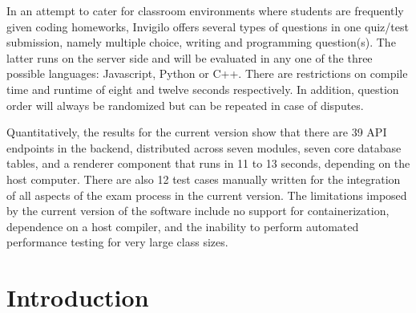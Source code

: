 \documentclass[12pt, a4paper]{report}
\begin{document}
\begin{justify}
{    In an attempt to cater for classroom environments where students are frequently given coding homeworks, Invigilo offers several types of questions in one quiz/test submission, namely multiple choice, writing and programming question(s). The latter runs on the server side and will be evaluated in any one of the three possible languages: Javascript, Python or C++. There are restrictions on compile time and runtime of eight and twelve seconds respectively. In addition, question order will always be randomized but can be repeated in case of disputes.

    Quantitatively, the results for the current version show that there are 39 API endpoints in the backend, distributed across seven modules, seven core database tables, and a renderer component that runs in 11 to 13 seconds, depending on the host computer. There are also 12 test cases manually written for the integration of all aspects of the exam process in the current version. The limitations imposed by the current version of the software include no support for containerization, dependence on a host compiler, and the inability to perform automated performance testing for very large class sizes.
  }
\end{justify}

\newpage
\setcounter{page}{4}
\thispagestyle{plain}
\tableofcontents

\newpage
\thispagestyle{plain}
\listoftables

\newpage
\thispagestyle{plain}
\listoffigures

\newpage
{}
\setcounter{page}{1}

\chapter{Introduction}
\end{document}
